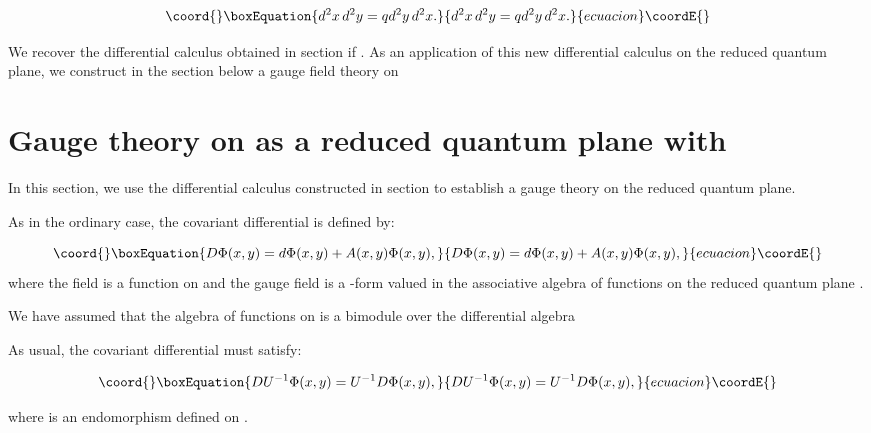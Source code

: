 \documentclass[a4paper,12pt,thmsa]{article}
\begin{document}
\begin{equation}\coord{}\boxEquation{
d^2x\, d^2y=qd^2y\, d^2x.
}{
d^2x\, d^2y=qd^2y\, d^2x.
}{ecuacion}\coordE{}\end{equation}

We recover the differential calculus obtained in section \coordHE{} if \coordHE{}. As
an application of this new differential calculus \coordHE{}  \coordHE{} on the reduced
quantum plane, we construct in the section below a gauge field theory on \coordHE{}

\section{Gauge theory on \coordHE{} as a reduced quantum plane with \coordHE{}}

In this section, we use the \coordHE{} differential calculus constructed in
section \coordHE{} to establish a gauge theory on the reduced quantum plane.

As in the ordinary case, the covariant differential is defined by:

\begin{equation}\coord{}\boxEquation{
D\Phi (x,y)=d\Phi (x,y)+A(x,y)\Phi (x,y),
}{
D\Phi (x,y)=d\Phi (x,y)+A(x,y)\Phi (x,y),
}{ecuacion}\coordE{}\end{equation}
where the field \coordHE{} is a function on \coordHE{} and the gauge field \coordHE{} is a \coordHE{}-form valued in the associative algebra of functions on the
reduced quantum plane \coordHE{}.

We have assumed that the algebra of functions on \coordHE{} is a bimodule over
the differential algebra \coordHE{}

As usual, the covariant differential \coordHE{} must satisfy:

\begin{equation}\coord{}\boxEquation{
DU^{-1}\Phi (x,y)=U^{-1}D\Phi (x,y),
}{
DU^{-1}\Phi (x,y)=U^{-1}D\Phi (x,y),
}{ecuacion}\coordE{}\end{equation}

where \coordHE{} is an endomorphism defined on \coordHE{} .
\end{document}
